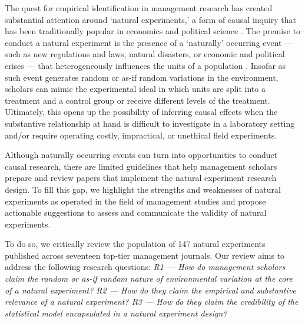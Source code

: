 
The quest for empirical identification in management research has created
substantial attention around `natural experiments,' a form of causal inquiry
that has been traditionally popular in economics
\parencite[][]{meyer1995,rosenzweig2000} and political science
\parencite[][]{dunning2008}.  The premise to conduct a natural experiment is the
presence of a `naturally' occurring event --- such as new regulations and laws,
natural disasters, or economic and political crises --- that heterogeneously
influences the units of a population \parencite[][]{dunning2012,robinson2009}.
Insofar as such event generates random or as-if random variations in the
environment, scholars can mimic the experimental ideal in which units are split
into a treatment and a control group or receive different levels of the
treatment. Ultimately, this opens up the possibility of inferring causal effects
when the substantive relationship at hand is difficult to investigate in a
laboratory setting and/or require operating costly, impractical, or unethical
field experiments.


Although naturally occurring events can turn into opportunities to conduct
causal research, there are limited guidelines that help management scholars
prepare and review papers that implement the natural experiment research design.
To fill this gap, we highlight the strengths and weaknesses of natural
experiments as operated in the field of management studies and propose
actionable suggestions to assess and communicate the validity of natural
experiments.

To do so, we critically review the population of 147 natural experiments
published across seventeen top-tier management journals. Our review aims
to address the following research questions: \emph{R1 --- How do management
scholars claim the random or as-if random nature of environmental variation at
the core of a natural experiment? R2 --- How do they claim the empirical and
substantive relevance of a natural experiment? R3 --- How do they claim the
credibility of the statistical model encapsulated in a natural experiment
design?}

